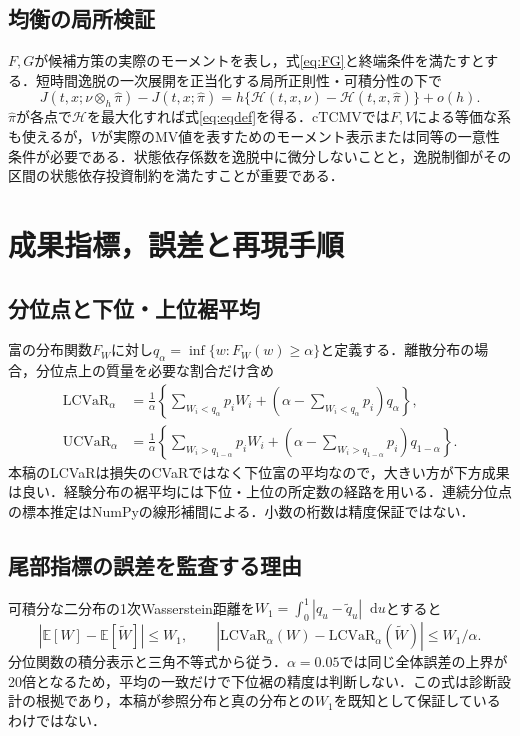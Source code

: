 \documentclass[10pt,a4paper]{article}
\numberwithin{equation}{section}
\numberwithin{table}{section}
\numberwithin{figure}{section}
\theoremstyle{plain}
\theoremstyle{definition}
\newcommand{\E}{\mathbb{E}}
\newcommand{\dd}{\mathop{}\!\mathrm{d}}
\begin{document}
\subsection{均衡の局所検証}
$F,G$が候補方策の実際のモーメントを表し，式\eqref{eq:FG}と終端条件を満たすとする．短時間逸脱の一次展開を正当化する局所正則性・可積分性の下で
\begin{equation}
J(t,x;\nu\otimes_h\hat\pi)-J(t,x;\hat\pi)
=h\{\mathcal H(t,x,\nu)-\mathcal H(t,x,\hat\pi)\}+o(h).
\end{equation}
$\hat\pi$が各点で$\mathcal H$を最大化すれば式\eqref{eq:eqdef}を得る．cTCMVでは$F,V$による等価な系も使えるが，$V$が実際のMV値を表すためのモーメント表示または同等の一意性条件が必要である．状態依存係数を逸脱中に微分しないことと，逸脱制御がその区間の状態依存投資制約を満たすことが重要である．

\section{成果指標，誤差と再現手順}
\label{app:repro}
\subsection{分位点と下位・上位裾平均}
富の分布関数$F_W$に対し$q_\alpha=\inf\{w:F_W(w)\geq\alpha\}$と定義する．離散分布の場合，分位点上の質量を必要な割合だけ含め
\begin{align}
\mathrm{LCVaR}_\alpha&=\frac1\alpha\left\{\sum_{W_i<q_\alpha}p_iW_i+
\left(\alpha-\sum_{W_i<q_\alpha}p_i\right)q_\alpha\right\},\\
\mathrm{UCVaR}_\alpha&=\frac1\alpha\left\{\sum_{W_i>q_{1-\alpha}}p_iW_i+
\left(\alpha-\sum_{W_i>q_{1-\alpha}}p_i\right)q_{1-\alpha}\right\}.
\end{align}
本稿のLCVaRは損失のCVaRではなく下位富の平均なので，大きい方が下方成果は良い．経験分布の裾平均には下位・上位の所定数の経路を用いる．連続分位点の標本推定はNumPyの線形補間による．小数の桁数は精度保証ではない．

\subsection{尾部指標の誤差を監査する理由}
可積分な二分布の1次Wasserstein距離を$W_1=\int_0^1|q_u-\widetilde q_u|\dd u$とすると
\begin{equation}
|\E[W]-\E[\widetilde W]|\leq W_1,\qquad
|\mathrm{LCVaR}_\alpha(W)-\mathrm{LCVaR}_\alpha(\widetilde W)|\leq W_1/\alpha.
\end{equation}
分位関数の積分表示と三角不等式から従う．$\alpha=0.05$では同じ全体誤差の上界が20倍となるため，平均の一致だけで下位裾の精度は判断しない．この式は診断設計の根拠であり，本稿が参照分布と真の分布との$W_1$を既知として保証しているわけではない．
\end{document}
